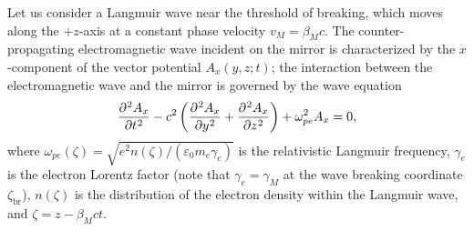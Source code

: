\documentclass[10pt, a4paper, twoside, openright]{report}
\begin{document}
Let us consider a Langmuir wave near the threshold of breaking, which moves along the $ +z $-axis at a constant phase velocity $ v_{M} = \beta_M c $. The counter-propagating electromagnetic wave incident on the mirror is characterized by the $ x $-component of the vector potential $ A_x \left( y, z; t \right) $; the interaction between the electromagnetic wave and the mirror is governed by the wave equation \cite{Panchenko2008, Bulanov2013}
\begin{equation}\label{eq:refl_coeff_vector_potential}
	\diffp[2]{A_x}{t} - c^2 \left( \diffp[2]{A_x}{y} + \diffp[2]{A_x}{z} \right) + \omega_{pe}^2 A_x = 0,
\end{equation}
where $ \omega_{pe} \left( \zeta \right) = \sqrt{e^2 n\left( \zeta \right) / \left( \varepsilon_0 m_e \gamma_e \right)} $ is the relativistic Langmuir frequency, $ \gamma_e $ is the electron Lorentz factor (note that $ \gamma_e = \gamma_M $ at the wave breaking coordinate $ \zeta_{\mathrm{br}} $), $ n \left( \zeta \right) $ is the distribution of the electron density within the Langmuir wave, and $ \zeta = z - \beta_M c t $. 

\end{document}
